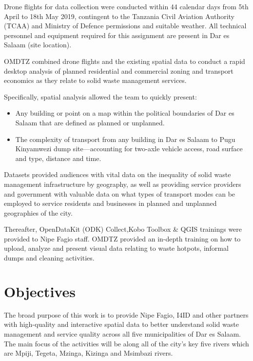 \documentclass[a4paper,12pt,twoside]{article}
\begin{document}
Drone flights for data collection were conducted within 44 calendar days from 5th April to 18th May 2019, contingent  to the Tanzania Civil Aviation Authority (TCAA) and Ministry of Defence permissions and suitable weather. All technical personnel and equipment required for this assignment are present in Dar es Salaam (site location). 

OMDTZ  combined drone flights and the existing spatial data to conduct a rapid desktop analysis of planned residential and commercial zoning and transport economics as they relate to solid waste management services.

Specifically, spatial analysis allowed the team to quickly present:
\begin{itemize}
    \item Any building or point on a map within the political boundaries of Dar es Salaam that are defined as planned or unplanned.
    \item The complexity of transport from any building in Dar es Salaam to Pugu Kinyamwezi dump site---accounting for two-axle vehicle access, road surface and type, distance and time. 
\end{itemize}
    
Datasets provided audiences with vital data on the inequality of solid waste management infrastructure by geography, as well as providing service providers and government with valuable data on what types of transport modes can be employed to service residents and businesses in planned and unplanned geographies of the city.  

Thereafter, OpenDataKit (ODK) Collect,Kobo Toolbox & QGIS trainings were provided to Nipe Fagio staff. OMDTZ provided an in-depth training on how to upload, analyze and present visual data relating to waste hotpots, informal dumps and cleaning activities.


\newpage
\section{Objectives}

The broad purpose of this work is to provide Nipe Fagio, I4ID and other partners with high-quality and interactive spatial data to better understand solid waste management and service quality across all five municipalities of Dar es Salaam. The main focus of the activities will be along all of the city’s key five rivers which are Mpiji, Tegeta, Mzinga, Kizinga and Msimbazi rivers.
\end{document}
